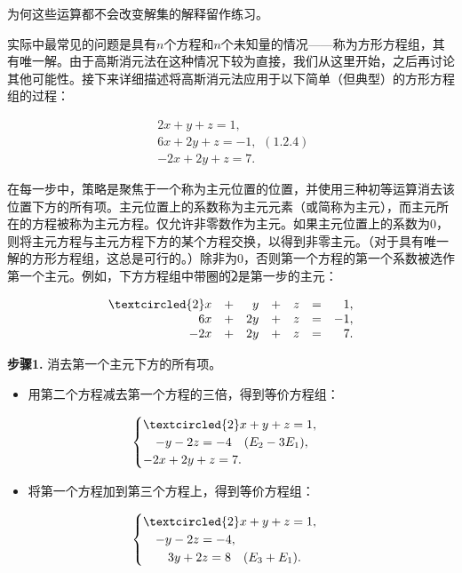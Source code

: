 为何这些运算都不会改变解集的解释留作练习。

实际中最常见的问题是具有\( n \)个方程和\( n \)个未知量的情况——称为\(\textbf{方形方程组}\)，其有唯一解。由于高斯消元法在这种情况下较为直接，我们从这里开始，之后再讨论其他可能性。接下来详细描述将高斯消元法应用于以下简单（但典型）的方形方程组的过程：

\[\begin{aligned}2x+y+z=1,\\6x+2y+z=-1,\\-2x+2y+z=7.\end{aligned} (1.2.4)\]

在每一步中，策略是聚焦于一个称为\(\textbf{主元位置}\)的位置，并使用三种初等运算消去该位置下方的所有项。主元位置上的系数称为\(\textbf{主元元素}\)（或简称为\(\textbf{主元}\)），而主元所在的方程被称为\(\textbf{主元方程}\)。仅允许非零数作为主元。如果主元位置上的系数为0，则将主元方程与主元方程下方的某个方程交换，以得到非零主元。（对于具有唯一解的方形方程组，这总是可行的。）除非为0，否则第一个方程的第一个系数被选作第一个主元。例如，下方方程组中带圈的\textcircled{2}是第一步的主元：

\[\begin{array}{rcrcrcr}\textcircled{2}x&+&y&+&z&=&1,\\6x&+&2y&+&z&=&-1,\\-2x&+&2y&+&z&=&7.\end{array}\]

\textbf{步骤1.} 消去第一个主元下方的所有项。
\begin{itemize}
	\item 用第二个方程减去第一个方程的三倍，得到等价方程组：
\end{itemize}

\[
\begin{cases}
	\textcircled{2}x + y + z = 1, \\
	\quad - y - 2z = -4 \quad (E_2 - 3E_1), \\
	-2x + 2y + z = 7.
\end{cases}
\]

\begin{itemize}
	\item 将第一个方程加到第三个方程上，得到等价方程组：
\end{itemize}
\[
\begin{cases}
	\textcircled{2}x + y + z = 1, \\
	\quad - y - 2z = -4, \\
	\quad\quad 3y + 2z = 8 \quad (E_3 + E_1).
\end{cases}
\]

